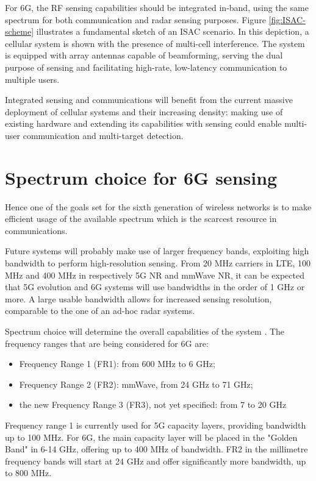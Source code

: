 For 6G, the RF sensing capabilities should be integrated in-band, using the same spectrum for both communication and radar sensing purposes. Figure \ref{fig:ISAC-scheme} illustrates a fundamental sketch of an ISAC scenario. In this depiction, a cellular system is shown with the presence of multi-cell interference. The system is equipped with array antennas capable of beamforming, serving the dual purpose of sensing and facilitating high-rate, low-latency communication to multiple users.

Integrated sensing and communications will benefit from the current massive deployment of cellular systems and their increasing density: making use of existing hardware and extending its capabilities with sensing could enable multi-user communication and multi-target detection.

\section{Spectrum choice for 6G sensing}

 Hence one of the goals set for the sixth generation of wireless networks is to make efficient usage of the available spectrum which is the scarcest resource in communications.

Future systems will probably make use of larger frequency bands, exploiting high bandwidth to perform high-resolution sensing. From 20 MHz carriers in LTE, 100 MHz and 400 MHz in respectively 5G NR and mmWave NR, it can be expected that 5G evolution and 6G systems will use bandwidths in the order of 1 GHz or more. A large usable bandwidth allows for increased sensing resolution, comparable to the one of an ad-hoc radar systems.

Spectrum choice will determine the overall capabilities of the system \cite{Wild_Grudnitsky_Mandelli_Henninger_Guan_Schaich_2023}. The frequency ranges that are being considered for 6G \cite{Hexa} are:

\begin{itemize}
	\item Frequency Range 1 (FR1): from 600 MHz to 6 GHz;
	\item Frequency Range 2 (FR2): mmWave, from 24 GHz to 71 GHz;
	\item the new Frequency Range 3 (FR3), not yet specified: from 7 to 20 GHz
\end{itemize}

Frequency range 1 is currently used for 5G capacity layers, providing bandwidth up to 100 MHz. For 6G, the main capacity layer will be placed in the "Golden Band" in 6-14 GHz, offering up to 400 MHz of bandwidth. FR2 in the millimetre frequency bands will start at 24 GHz and offer significantly more bandwidth, up to 800 MHz.

